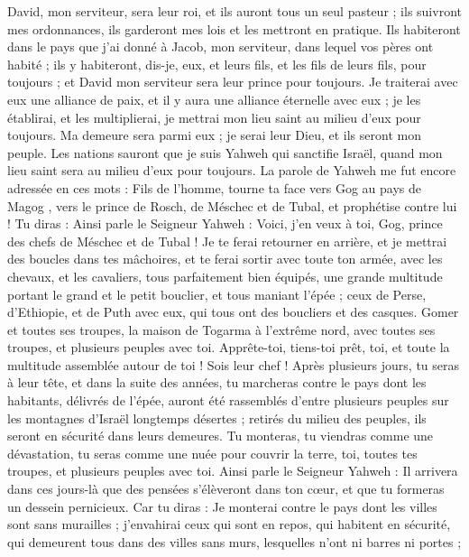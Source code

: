 \begin{multicols}{2}
David, mon serviteur, sera leur roi, et ils auront tous un seul pasteur ; ils suivront mes ordonnances, ils garderont mes lois et les mettront en pratique.
Ils habiteront dans le pays que j'ai donné à Jacob, mon serviteur, dans lequel vos pères ont habité ; ils y habiteront, dis-je, eux, et leurs fils, et les fils de leurs fils, pour toujours ; et David mon serviteur sera leur prince pour toujours.
Je traiterai avec eux une alliance de paix, et il y aura une alliance éternelle avec eux ; je les établirai, et les multiplierai, je mettrai mon lieu saint au milieu d'eux pour toujours.
Ma demeure sera parmi eux ; je serai leur Dieu, et ils seront mon peuple.
Les nations sauront que je suis Yahweh qui sanctifie Israël, quand mon lieu saint sera au milieu d'eux pour toujours.
\VerseOne{}La parole de Yahweh me fut encore adressée en ces mots :
Fils de l’homme, tourne ta face vers Gog au pays de Magog\FTNT{}  , vers le prince de Rosch, de Méschec et de Tubal, et prophétise contre lui !
Tu diras : Ainsi parle le Seigneur Yahweh : Voici, j'en veux à toi, Gog, prince des chefs de Méschec et de Tubal !
Je te ferai retourner en arrière, et je mettrai des boucles dans tes mâchoires, et te ferai sortir avec toute ton armée, avec les chevaux, et les cavaliers, tous parfaitement bien équipés, une grande multitude portant le grand et le petit bouclier, et tous maniant l'épée ;
ceux de Perse, d’Ethiopie, et de Puth avec eux, qui tous ont des boucliers et des casques.
Gomer et toutes ses troupes, la maison de Togarma à l’extrême nord, avec toutes ses troupes, et plusieurs peuples avec toi.
Apprête-toi, tiens-toi prêt, toi, et toute la multitude assemblée autour de toi ! Sois leur chef !
Après plusieurs jours, tu seras à leur tête, et dans la suite des années, tu marcheras contre le pays dont les habitants, délivrés de l’épée, auront été rassemblés d’entre plusieurs peuples sur les montagnes d'Israël longtemps désertes ; retirés du milieu des peuples, ils seront en sécurité dans leurs demeures.
Tu monteras, tu viendras comme une dévastation, tu seras comme une nuée pour couvrir la terre, toi, toutes tes troupes, et plusieurs peuples avec toi\FTNT{}.
Ainsi parle le Seigneur Yahweh : Il arrivera dans ces jours-là que des pensées s’élèveront dans ton cœur, et que tu formeras un dessein pernicieux.
Car tu diras : Je monterai contre le pays dont les villes sont sans murailles ; j'envahirai ceux qui sont en repos, qui habitent en sécurité, qui demeurent tous dans des villes sans murs, lesquelles n'ont ni barres ni portes\FTNT{} ;

\end{multicols}
